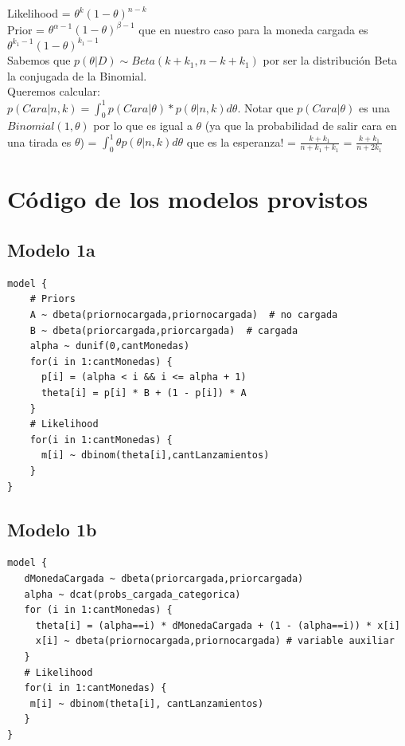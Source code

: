 \documentclass[a4paper]{article}
\begin{document}
Likelihood = $\theta^{k}(1-\theta)^{n - k}$ \\
Prior = $\theta^{\alpha - 1}(1-\theta)^{\beta - 1}$ que en nuestro caso para la moneda cargada es $ \theta^{k_1 - 1}(1-\theta)^{k_1 - 1} $ \\
Sabemos que $p(\theta | D) \sim Beta(k + k_1, n - k + k_1)$ por ser la distribución Beta la conjugada de la Binomial. \\
Queremos calcular: \\
$p(Cara | n, k) 	= \int_{0}^{1} p(Cara | \theta) * p(\theta | n, k) d \theta$. Notar que $p(Cara | \theta)$ es una $Binomial(1, \theta)$ por lo que es igual a $\theta$ (ya que la probabilidad de salir cara en una tirada es $\theta$)
				= $\int_{0}^{1} \theta p(\theta | n, k) d \theta$ que es la esperanza!
				= $\frac {k + k_1}{n + k_1 + k_1}$
				= $\frac {k + k_1}{n + 2k_1}$
\newpage
\section {Código de los modelos provistos}

\subsection{Modelo 1a}
\begin{lstlisting} 
model { 
    # Priors 
    A ~ dbeta(priornocargada,priornocargada)  # no cargada 
    B ~ dbeta(priorcargada,priorcargada)  # cargada 
    alpha ~ dunif(0,cantMonedas) 
    for(i in 1:cantMonedas) { 
      p[i] = (alpha < i && i <= alpha + 1) 
      theta[i] = p[i] * B + (1 - p[i]) * A 
    } 
    # Likelihood 
    for(i in 1:cantMonedas) { 
      m[i] ~ dbinom(theta[i],cantLanzamientos) 
    } 
}       
\end{lstlisting}

\subsection{Modelo 1b}

\begin{lstlisting} 
model { 
   dMonedaCargada ~ dbeta(priorcargada,priorcargada)
   alpha ~ dcat(probs_cargada_categorica)
   for (i in 1:cantMonedas) { 
     theta[i] = (alpha==i) * dMonedaCargada + (1 - (alpha==i)) * x[i] 
     x[i] ~ dbeta(priornocargada,priornocargada) # variable auxiliar 
   } 
   # Likelihood 
   for(i in 1:cantMonedas) { 
    m[i] ~ dbinom(theta[i], cantLanzamientos) 
   } 
} 
\end{lstlisting} 
\end{document}
